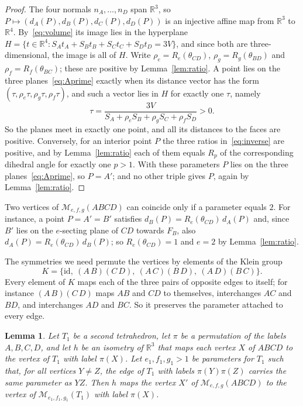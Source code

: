 \documentclass[11pt]{amsart}
\newtheorem{lemma}[theorem]{Lemma}
\theoremstyle{definition}
\theoremstyle{remark}
\numberwithin{equation}{section}
\newcommand{\R}{\mathbb{R}}
\newcommand{\M}{\mathcal{M}}
\begin{document}
\begin{proof}
The four normals $n_A,\dots,n_D$ span $\R^3$, so $P\mapsto(d_A(P),d_B(P),d_C(P),d_D(P))$ is an injective affine map from $\R^3$ to $\R^4$. By~\eqref{eq:volume} its image lies in the hyperplane $H=\{t\in\R^4: S_At_A+S_Bt_B+S_Ct_C+S_Dt_D=3V\}$, and since both are three-dimensional, the image is all of $H$. Write $\rho_e=R_e(\theta_{CD})$, $\rho_g=R_g(\theta_{BD})$ and $\rho_f=R_f(\theta_{BC})$; these are positive by Lemma~\ref{lem:ratio}. A point lies on the three planes~\eqref{eq:Aprime} exactly when its distance vector has the form $(\tau,\rho_e\tau,\rho_g\tau,\rho_f\tau)$, and such a vector lies in $H$ for exactly one $\tau$, namely
\[
\tau=\frac{3V}{S_A+\rho_eS_B+\rho_gS_C+\rho_fS_D}>0 .
\]
So the planes meet in exactly one point, and all its distances to the faces are positive. Conversely, for an interior point $P$ the three ratios in~\eqref{eq:inverse} are positive, and by Lemma~\ref{lem:ratio} each of them equals $R_p$ of the corresponding dihedral angle for exactly one $p>1$. With these parameters $P$ lies on the three planes~\eqref{eq:Aprime}, so $P=A'$; and no other triple gives $P$, again by Lemma~\ref{lem:ratio}.
\end{proof}

Two vertices of $\M_{e,f,g}(ABCD)$ can coincide only if a parameter equals $2$. For instance, a point $P=A'=B'$ satisfies $d_B(P)=R_e(\theta_{CD})\,d_A(P)$ and, since $B'$ lies on the $e$-secting plane of $CD$ towards $F_B$, also $d_A(P)=R_e(\theta_{CD})\,d_B(P)$; so $R_e(\theta_{CD})=1$ and $e=2$ by Lemma~\ref{lem:ratio}.

The symmetries we need permute the vertices by elements of the Klein group
\[
K=\{\mathrm{id},\ (A\,B)(C\,D),\ (A\,C)(B\,D),\ (A\,D)(B\,C)\}.
\]
Every element of $K$ maps each of the three pairs of opposite edges to itself; for instance $(A\,B)(C\,D)$ maps $AB$ and $CD$ to themselves, interchanges $AC$ and $BD$, and interchanges $AD$ and $BC$. So it preserves the parameter attached to every edge.

\begin{lemma}\label{lem:equiv}
Let $T_1$ be a second tetrahedron, let $\pi$ be a permutation of the labels $A,B,C,D$, and let $h$ be an isometry of $\R^3$ that maps each vertex $X$ of $ABCD$ to the vertex of $T_1$ with label $\pi(X)$. Let $e_1,f_1,g_1>1$ be parameters for $T_1$ such that, for all vertices $Y\ne Z$, the edge of $T_1$ with labels $\pi(Y)\pi(Z)$ carries the same parameter as $YZ$. Then $h$ maps the vertex $X'$ of $\M_{e,f,g}(ABCD)$ to the vertex of $\M_{e_1,f_1,g_1}(T_1)$ with label $\pi(X)$.
\end{lemma}
\end{document}
